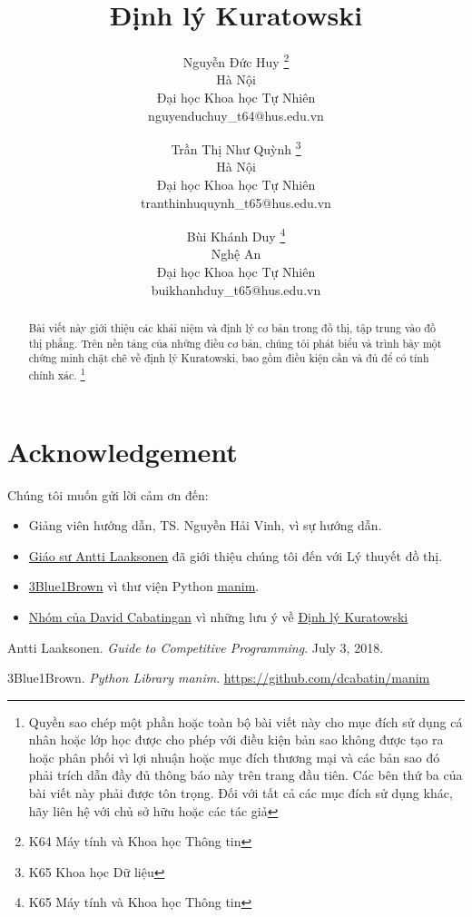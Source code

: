 \documentclass[12pt]{article}
\title{\textbf{Định lý Kuratowski}}
\author{
    Nguyễn Đức Huy \thanks{K64 Máy tính và Khoa học Thông tin}\\
    Hà Nội \\
    Đại học Khoa học Tự Nhiên \\
    nguyenduchuy\_t64@hus.edu.vn
    \and
    Trần Thị Như Quỳnh \thanks{K65 Khoa học Dữ liệu} \\
    Hà Nội \\
    Đại học Khoa học Tự Nhiên \\
    tranthinhuquynh\_t65@hus.edu.vn
    \and
    Bùi Khánh Duy \thanks{K65 Máy tính và Khoa học Thông tin}\\
    Nghệ An \\
    Đại học Khoa học Tự Nhiên \\
    buikhanhduy\_t65@hus.edu.vn
}
\begin{document}
\begin{titlepage}
    \maketitle
    \begin{abstract}
        Bài viết này giới thiệu các khái niệm và định lý cơ bản trong đồ thị, tập trung vào đồ thị phẳng. Trên nền tảng của những điều cơ bản, chúng tôi phát biểu và trình bày một chứng minh chặt chẽ về định lý Kuratowski, bao gồm điều kiện cần và đủ để có tính chính xác. \footnote{Quyền sao chép một phần hoặc toàn bộ bài viết này cho mục đích sử dụng cá nhân hoặc lớp học được cho phép với điều kiện bản sao không được tạo ra hoặc phân phối vì lợi nhuận hoặc mục đích thương mại và các bản sao đó phải trích dẫn đầy đủ thông báo này trên trang đầu tiên. Các bên thứ ba của bài viết này phải được tôn trọng. Đối với tất cả các mục đích sử dụng khác, hãy liên hệ với chủ sở hữu hoặc các tác giả}
    \end{abstract}
\end{titlepage}

\begin{titlepage}
    \tableofcontents
\end{titlepage}







\section*{Acknowledgement}
Chúng tôi muốn gửi lời cảm ơn đến:
\begin{itemize}
    \item Giảng viên hướng dẫn, TS. Nguyễn Hải Vinh, vì sự hướng dẫn.
    \item \href{https://cses.fi/book/book.pdf}{Giáo sư Antti Laaksonen} đã giới thiệu chúng tôi đến với Lý thuyết đồ thị.
    \item \href{https://www.youtube.com/channel/UCYO_jab_esuFRV4b17AJtAw}{3Blue1Brown} vì thư viện Python \href{https://github.com/dcabatin/manim}{manim}.
    \item \href{https://www.youtube.com/watch?v=DOnY6eZi2E8}{Nhóm của David Cabatingan} vì những lưu ý về \hyperref[thr:kuratowski]{Định lý Kuratowski}
\end{itemize}
\begin{thebibliography}{9}
    Antti Laaksonen.
    \textit{Guide to Competitive Programming}.
    July 3, 2018.

    3Blue1Brown.
    \textit{Python Library manim}.
    \url{https://github.com/dcabatin/manim}

\end{thebibliography}
\end{document}
